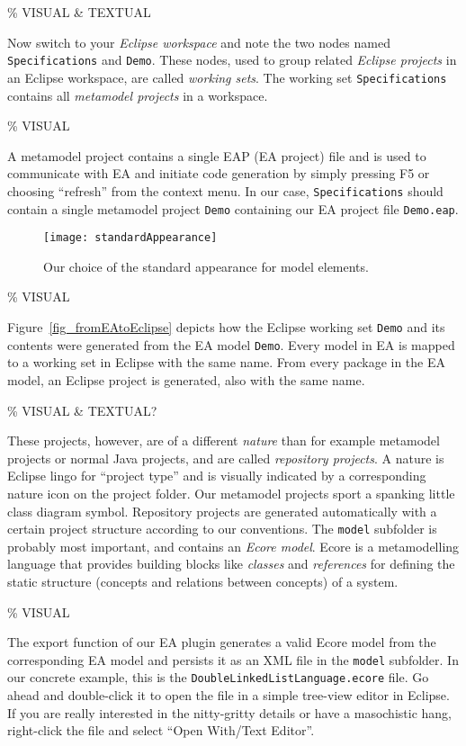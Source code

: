 \% VISUAL \& TEXTUAL

Now switch to your \emph{Eclipse workspace} and note the two nodes named \texttt{Spe\-ci\-fi\-ca\-tions} and \texttt{Demo}.  These nodes, used to group related \emph{Eclipse projects} in an Eclipse workspace, are called \emph{working sets}.
The working set \texttt{Spe\-ci\-fi\-ca\-tions} contains all \emph{metamodel projects} in a  workspace.

\% VISUAL

A metamodel project contains a single EAP (EA project) file and is used to communicate with EA and initiate code generation by simply pressing F5 or choosing ``refresh'' from the context menu.
In our case, \texttt{Specifications} should contain a single metamodel project \texttt{Demo} containing our EA project file  \texttt{Demo.eap}.

\begin{figure}[htbp]
  \centering
  \texttt{[image: standardAppearance]}
  \caption{Our choice of the standard appearance for model elements.}
  \label{fig_standardAppearanceEA}
\end{figure}

\% VISUAL

Figure~\ref{fig_fromEAtoEclipse} depicts how the Eclipse working set \texttt{Demo} and its contents were generated from the EA model \texttt{Demo}.
Every model in EA is mapped to a working set in Eclipse with the same name. 
From every package in the EA model, an Eclipse project is generated, also with the same name.

\% VISUAL \& TEXTUAL?

These projects, however, are of a different \emph{nature} than for example metamodel projects or normal Java projects, and are called \emph{repository projects}.  
A nature is Eclipse lingo for ``project type'' and is visually indicated by a corresponding nature icon on the project folder.
Our  metamodel projects sport a spanking little class diagram symbol. 
Repository projects are generated automatically  with a certain project structure according to our conventions.  
The  \texttt{model} subfolder is probably most important, and contains an  \emph{Ecore model}.  
Ecore is a metamodelling language that provides building  blocks like \emph{classes} and \emph{references} for defining the  static structure (concepts and relations between concepts) of a system.  

\% VISUAL

The  export function of our EA plugin generates a valid Ecore model from the  corresponding EA model and persists it as an XML file in the \texttt{model}  subfolder.  
In our concrete example, this is the \texttt{DoubleLinkedListLanguage.ecore} file.  
Go ahead and double-click it to open the file in a simple tree-view editor in Eclipse.  
If you are really interested in the nitty-gritty details or have a masochistic hang, right-click the file and select ``Open With/Text Editor''. 

